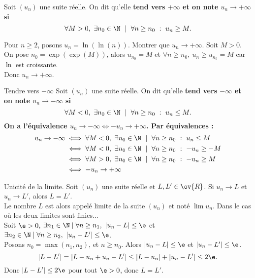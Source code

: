 \documentclass[11pt]{article}
\begin{document}
\begin{defi}{}{}
    Soit $(u_n)$ une suite réelle. On dit qu'elle \bf{tend vers} $+\infty$ et on note $u_n\to+\infty$ si
    \begin{equation*}
        \forall M > 0, ~ \exists n_0 \in \N ~ \mid ~ \forall n \geq n_0 ~ : ~ u_n \geq M.
    \end{equation*}
\end{defi}

\begin{ex}{}{}
    Pour $n\geq2$, posons $u_n=\ln(\ln(n))$. Montrer que $u_n\to+\infty$.
    \tcblower
    Soit $M>0$. On pose $n_0=\exp(\exp(M))$, alors $u_{n_0}=M$ et $\forall n\geq n_0, ~ u_n \geq u_{n_0} = M$ car $\ln$ est croissante.\\
    Donc $u_n\to+\infty$.
\end{ex}

\begin{prop}{Tendre vers $-\infty$}{}
    Soit $(u_n)$ une suite réelle. On dit qu'elle \bf{tend} vers $-\infty$ et on note $u_n\to-\infty$ si
    \begin{equation*}
        \forall M < 0, ~ \exists n_0 \in \N ~ \mid ~ \forall n \geq n_0 ~ : ~ u_n \leq M.
    \end{equation*}
    On a l'équivalence $u_n\to-\infty \iff -u_n \to +\infty$.
    \tcblower
    Par équivalences :
    \begin{align*}
        u_n \to -\infty &\iff \forall M < 0, ~ \exists n_0 \in \N ~ \mid ~ \forall n \geq n_0 ~ : ~ u_n \leq M\\
        &\iff \forall M < 0, ~ \exists n_0 \in \N ~ \mid ~ \forall n \geq n_0 ~ : ~ -u_n \geq  -M\\
        &\iff \forall M > 0, ~ \exists n_0 \in \N ~ \mid ~ \forall n \geq n_0 ~ : ~ -u_n \geq M\\
        &\iff -u_n \to +\infty
    \end{align*}
\end{prop}

\begin{prop}{Unicité de la limite.}{}
    Soit $(u_n)$ une suite réelle et $L,L'\in\ov{R}$. Si $u_n\to L$ et $u_n\to L'$, alors $L=L'$.\\
    Le nombre $L$ est alors appelé limite de la suite $(u_n)$ et noté $\lim u_n$.
    \tcblower
    Dans le cas où les deux limites sont finies...\\
    Soit $\e>0$, $\exists n_1 \in \N \mid \forall n \geq n_1, ~ |u_n - L| \leq \e$ et $\exists n_2 \in \N \mid \forall n \geq n_2, ~ |u_n - L'| \leq \e$.\\
    Posons $n_0 = \max(n_1,n_2)$, et $n\geq n_0$. Alors $|u_n-L|\leq \e$ et $|u_n-L'|\leq\e$.
    \begin{equation*}
        |L-L'| = |L - u_n + u_n - L'| \leq |L - u_n| + |u_n - L'| \leq 2\e.
    \end{equation*}
    Donc $|L-L'|\leq 2\e$ pour tout $\e>0$, donc $L=L'$.
\end{prop}
\end{document}
